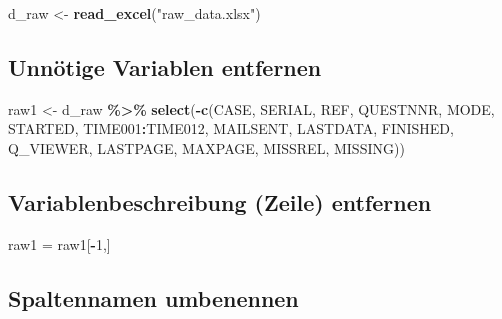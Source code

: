 \documentclass[
]{article}
\newenvironment{Shaded}{\begin{snugshade}}{\end{snugshade}}
\newcommand{\DecValTok}[1]{\textcolor[rgb]{0.00,0.00,0.81}{#1}}
\newcommand{\FunctionTok}[1]{\textcolor[rgb]{0.13,0.29,0.53}{\textbf{#1}}}
\newcommand{\NormalTok}[1]{#1}
\newcommand{\OtherTok}[1]{\textcolor[rgb]{0.56,0.35,0.01}{#1}}
\newcommand{\SpecialCharTok}[1]{\textcolor[rgb]{0.81,0.36,0.00}{\textbf{#1}}}
\newcommand{\StringTok}[1]{\textcolor[rgb]{0.31,0.60,0.02}{#1}}
\begin{document}
\begin{Shaded}
\begin{Highlighting}[]
\NormalTok{d\_raw }\OtherTok{\textless{}{-}} \FunctionTok{read\_excel}\NormalTok{(}\StringTok{"raw\_data.xlsx"}\NormalTok{)}
\end{Highlighting}
\end{Shaded}

\subsection{Unnötige Variablen
entfernen}\label{unnuxf6tige-variablen-entfernen}

\begin{Shaded}
\begin{Highlighting}[]
\NormalTok{raw1 }\OtherTok{\textless{}{-}}\NormalTok{ d\_raw }\SpecialCharTok{\%\textgreater{}\%} 
  \FunctionTok{select}\NormalTok{(}\SpecialCharTok{{-}}\FunctionTok{c}\NormalTok{(CASE, SERIAL, REF, QUESTNNR, MODE, STARTED, TIME001}\SpecialCharTok{:}\NormalTok{TIME012, MAILSENT, LASTDATA, FINISHED, Q\_VIEWER, LASTPAGE, MAXPAGE, MISSREL, MISSING))}
\end{Highlighting}
\end{Shaded}

\subsection{Variablenbeschreibung (Zeile)
entfernen}\label{variablenbeschreibung-zeile-entfernen}

\begin{Shaded}
\begin{Highlighting}[]
\NormalTok{raw1 }\OtherTok{=}\NormalTok{ raw1[}\SpecialCharTok{{-}}\DecValTok{1}\NormalTok{,]}
\end{Highlighting}
\end{Shaded}

\subsection{Spaltennamen umbenennen}\label{spaltennamen-umbenennen}
\end{document}
